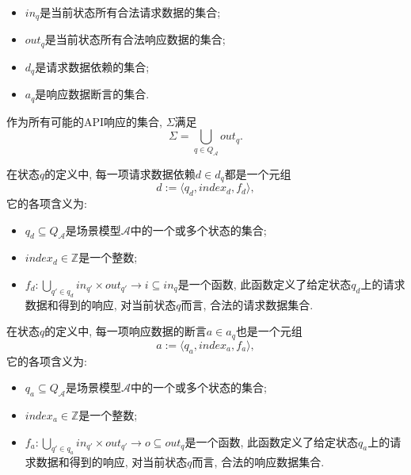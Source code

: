 \begin{definition}
\begin{itemize}
                \item $in_q$是当前状态所有合法请求数据的集合;
                
                \item $out_q$是当前状态所有合法响应数据的集合;
                
                \item $d_q$是请求数据依赖的集合;
                
                \item $a_q$是响应数据断言的集合.
            \end{itemize}
            
            作为所有可能的API响应的集合, $\Sigma$满足
            \begin{equation}
                \Sigma = \bigcup_{q \in Q_{\mathcal{A}}} out_q.
            \end{equation}
            
            在状态$q$的定义中, 每一项请求数据依赖$d \in d_q$都是一个元组
            \begin{equation}
                \label{eq:scenario_request_depen}
                d := \langle q_d, index_d, f_d\rangle,
            \end{equation}
            它的各项含义为:
            \begin{itemize}
                \item $q_d \subseteq Q_{\mathcal{A}}$是场景模型$\mathcal{A}$中的一个或多个状态的集合;
                
                \item $index_d \in \mathbb{Z}$是一个整数;
                
                \item $f_d: \bigcup_{q' \in q_d} in_{q'} \times out_{q'} \to i \subseteq in_q$是一个函数, 此函数定义了给定状态$q_d$上的请求数据和得到的响应, 对当前状态$q$而言, 合法的请求数据集合.
            \end{itemize}
            
            在状态$q$的定义中, 每一项响应数据的断言$a \in a_q$也是一个元组
            \begin{equation}
                a := \langle q_a, index_a, f_a\rangle,
            \end{equation}
            它的各项含义为:
            \begin{itemize}
                \item $q_a \subseteq Q_{\mathcal{A}}$是场景模型$\mathcal{A}$中的一个或多个状态的集合;
                
                \item $index_a \in \mathbb{Z}$是一个整数;
                
                \item $f_a: \bigcup_{q' \in q_a} in_{q'} \times out_{q'} \to o \subseteq out_q$是一个函数, 此函数定义了给定状态$q_a$上的请求数据和得到的响应, 对当前状态$q$而言, 合法的响应数据集合.
            \end{itemize}
        \end{definition}
        
